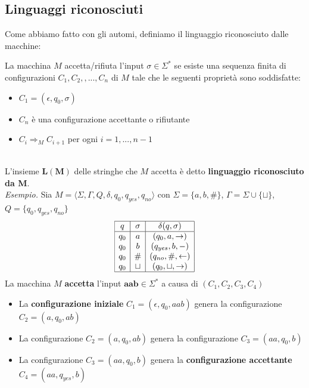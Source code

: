 \subsection{Linguaggi riconosciuti} \label{ling}
Come abbiamo fatto con gli automi, definiamo il linguaggio riconosciuto dalle macchine:\smallskip\\
\colorbox{SALZO}{\parbox{\dimexpr\linewidth-2\fboxsep}{\begin{definition}
   La macchina $M$ accetta/rifiuta l'input $\sigma \in \Sigma^*$ se esiste una sequenza finita di configurazioni $C_1,C_2,,...,C_n$ di $M$
   tale che le seguenti proprietà sono soddisfatte:
   \begin{itemize}
    \item $C_1 = (\epsilon,q_0,\sigma)$
    \item $C_n$ è una configurazione accettante o rifiutante 
    \item $C_i \Rightarrow_M C_{i+1}$ per ogni $i = 1,...,n-1$
   \end{itemize}
\end{definition}}}\smallskip\\
L'insieme $\bm{L(M)}$ delle stringhe che $M$ accetta è detto \textbf{linguaggio riconosciuto da M}.\smallskip\\
\textit{Esempio.} Sia $M = \langle \Sigma, \Gamma, Q, \delta, q_0, q_{yes}, q_{no} \rangle$ con $\Sigma = \{a, b, \#\}$, $\Gamma = \Sigma \cup \{\sqcup\}$, $Q = \{q_0, q_{yes}, q_{no}\}$
\[
\begin{array}{|c|c|c|}
\hline
q & \sigma & \delta(q, \sigma) \\
\hline
q_0 & a & (q_0, a, \rightarrow) \\
q_0 & b & (q_{yes}, b, -) \\
q_0 & \# & (q_{no}, \#, \leftarrow) \\
q_0 & \sqcup & (q_0, \sqcup, \rightarrow) \\
\hline
\end{array}
\]
La macchina $M$ \textbf{accetta} l'input $\bm{aab }\in \Sigma^*$ a causa di $(C_1, C_2, C_3, C_4)$
\begin{itemize}
    \item[-] La \textbf{configurazione iniziale} $C_1 = (\epsilon, q_0, aab)$ genera la configurazione $C_2 = (a, q_0, ab)$
    \item[-] La configurazione $C_2 = (a, q_0, ab)$ genera la configurazione $C_3 = (aa, q_0, b)$
    \item[-] La configurazione $C_3 = (aa, q_0, b)$ genera la \textbf{configurazione accettante} $C_4 = (aa, q_{yes}, b)$
\end{itemize}


